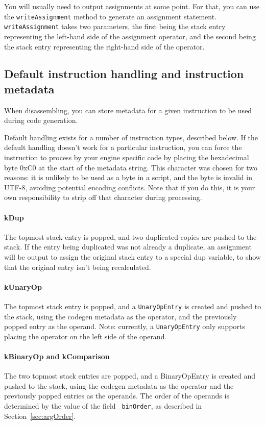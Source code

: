 You will usually need to output assignments at some point. For that, you can use the \verb+writeAssignment+ method to generate an assignment statement. \verb+writeAssignment+ takes two parameters, the first being the stack entry representing the left-hand side of the assignment operator, and the second being the stack entry representing the right-hand side of the operator.

\subsection{Default instruction handling and instruction metadata}
When disassembling, you can store metadata for a given instruction to be used during code generation.

Default handling exists for a number of instruction types, described below. If the default handling doesn't work for a particular instruction, you can force the instruction to process by your engine specific code by placing the hexadecimal byte 0xC0 at the start of the metadata string. This character was chosen for two reasons: it is unlikely to be used as a byte in a script, and the byte is invalid in UTF-8, avoiding potential encoding conflicts. Note that if you do this, it is your own responsibility to strip off that character during processing.

\paragraph{kDup}
The topmost stack entry is popped, and two duplicated copies are pushed to the stack. If the entry being duplicated was not already a duplicate, an assignment will be output to assign the original stack entry to a special dup variable, to show that the original entry isn't being recalculated.

\paragraph{kUnaryOp}
The topmost stack entry is popped, and a \verb+UnaryOpEntry+ is created and pushed to the stack, using the codegen metadata as the operator, and the previously popped entry as the operand. Note: currently, a \verb+UnaryOpEntry+ only supports placing the operator on the left side of the operand.

\paragraph{kBinaryOp and kComparison}
The two topmost stack entries are popped, and a BinaryOpEntry is created and pushed to the stack, using the codegen metadata as the operator and the previously popped entries as the operands. The order of the operands is determined by the value of the field \verb+_binOrder+, as described in Section~\vref{sec:argOrder}.

